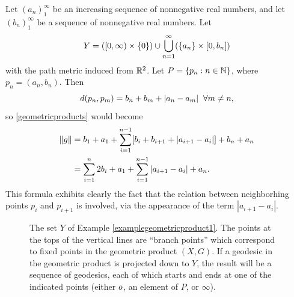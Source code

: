 \begin{example}
\label{examplegeometricproduct1}
Let $(a_n)_1^\infty$ be an increasing sequence of nonnegative real numbers, and let $(b_n)_1^\infty$ be a sequence of nonnegative real numbers. Let
\[
Y = ({[0,\infty)}\times\{0\}) \cup \bigcup_{n = 1}^\infty (\{a_n\}\times [0,b_n])
\]
with the path metric induced from $\R^2$. Let $P = \{p_n : n\in\N\}$, where $p_n = (a_n,b_n)$. Then
\begin{equation}
\label{geometricproduct1}
d(p_n,p_m) = b_n + b_m + |a_n - a_m| \;\;\forall m\neq n,
\end{equation}
so \eqref{geometricproducts} would become
\begin{align*}
\|g\| &= b_1 + a_1 + \sum_{i = 1}^{n - 1} [b_i + b_{i + 1} + |a_{i + 1} - a_i|] + b_n + a_n\\ 
&= \sum_{i = 1}^n 2b_i + a_1 + \sum_{i = 1}^{n - 1} |a_{i + 1} - a_i| + a_n.
\end{align*}
This formula exhibits clearly the fact that the relation between neighborhing points $p_i$ and $p_{i + 1}$ is involved, via the appearance of the term $|a_{i + 1} - a_i|$.
\end{example}

\begin{figure}
\caption[Another example of a geometric product]{The set $Y$ of Example \ref{examplegeometricproduct1}. The points at the tops of the vertical lines are ``branch points'' which correspond to fixed points in the geometric product $(X,G)$. If a geodesic in the geometric product is projected down to $Y$, the result will be a sequence of geodesics, each of which starts and ends at one of the indicated points (either $o$, an element of $P$, or $\infty$).}
\label{figuregeometricproduct}
\end{figure}



